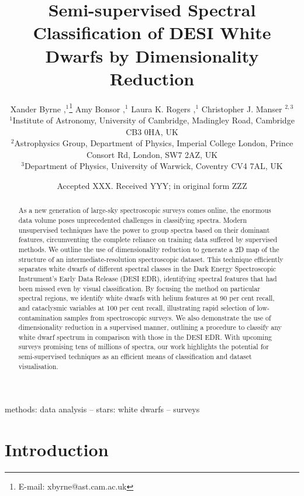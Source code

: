 \documentclass[fleqn,usenatbib]{mnras}
\title[
    Semi-supervised WD Spectral Classification
]{
    Semi-supervised Spectral Classification of DESI White Dwarfs by Dimensionality Reduction
}
\author[
    X. Byrne et al.
]{
    Xander Byrne
    \orcidlink{0000-0001-9488-238X},$^{1}$\thanks{E-mail: xbyrne@ast.cam.ac.uk}
    Amy Bonsor
    \orcidlink{0000-0002-8070-1901},$^{1}$
    Laura K. Rogers
    \orcidlink{0000-0002-3553-9474},$^{1}$
    Christopher J. Manser
    \orcidlink{0000-0003-1543-5405}$^{2,3}$
\\
$^{1}$Institute of Astronomy,
University of Cambridge,
Madingley Road,
Cambridge CB3 0HA,
UK\\
$^{2}$Astrophysics Group,
Department of Physics,
Imperial College London,
Prince Consort Rd,
London,
SW7 2AZ,
UK\\
$^{3}$Department of Physics,
University of Warwick,
Coventry CV4 7AL,
UK
}
\date{Accepted XXX. Received YYY; in original form ZZZ}
\begin{document}
\label{firstpage}
\pagerange{\pageref{firstpage}--\pageref{lastpage}}
\maketitle

\begin{abstract}
As a new generation of large-sky spectroscopic surveys comes online, the enormous data volume poses unprecedented challenges in classifying spectra. 
Modern unsupervised techniques have the power to group spectra based on their dominant features, circumventing the complete reliance on training data suffered by supervised methods.
We outline the use of dimensionality reduction to generate a 2D map of the structure of an intermediate-resolution spectroscopic dataset.
This technique efficiently separates white dwarfs of different spectral classes in the Dark Energy Spectroscopic Instrument's Early Data Release (DESI EDR), identifying spectral features that had been missed even by visual classification.
By focusing the method on particular spectral regions, we identify white dwarfs with helium features at 90 per cent recall, and cataclysmic variables at 100 per cent recall, illustrating rapid selection of low-contamination samples from spectroscopic surveys.
We also demonstrate the use of dimensionality reduction in a supervised manner, outlining a procedure to classify any white dwarf spectrum in comparison with those in the DESI EDR.
With upcoming surveys promising tens of millions of spectra, our work highlights the potential for semi-supervised techniques as an efficient means of classification and dataset visualisation.
\end{abstract}

\begin{keywords}
methods: data analysis -- stars: white dwarfs -- surveys
\end{keywords}



\section{Introduction}
\end{document}
